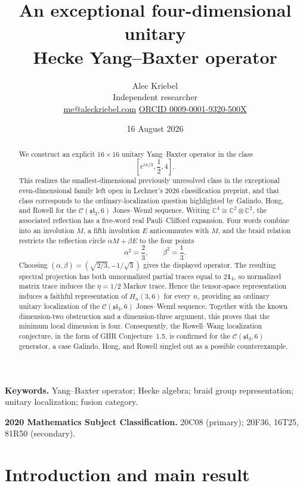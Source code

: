 \documentclass[11pt]{article}
\title{\vspace{-1.4cm}\textbf{An exceptional four-dimensional unitary}\\[0.2em]
\textbf{Hecke Yang--Baxter operator}}
\author{Alec Kriebel\\[-0.1em]
\small Independent researcher\\[-0.1em]
\small \href{mailto:me@aleckriebel.com}{me@aleckriebel.com}
\quad\textperiodcentered\quad
\href{https://orcid.org/0009-0001-9320-500X}{ORCID 0009-0001-9320-500X}}
\date{16 August 2026}
\theoremstyle{remark}
\newcommand{\Id}{\mathbf 1}
\newcommand{\bbC}{\mathbb C}
\newcommand{\cC}{\mathcal C}
\begin{document}
\maketitle

\begin{abstract}
We construct an explicit \(16\times16\) unitary Yang--Baxter operator in the
class
\[
  \left[e^{i\pi/3},\frac12,4\right].
\]
This realizes the smallest-dimensional previously unresolved class in the
exceptional even-dimensional family left open in Lechner's 2026 classification
preprint, and that class corresponds to the ordinary-localization question
highlighted by Galindo, Hong, and Rowell for the
\(\cC(\mathfrak{sl}_3,6)\) Jones--Wenzl sequence.  Writing
\(\bbC^4\cong\bbC^2\otimes\bbC^2\), the associated
reflection has a five-word real Pauli--Clifford expansion.  Four words combine
into an involution \(M\), a fifth involution \(E\) anticommutes with \(M\), and
the braid relation restricts the reflection circle \(\alpha M+\beta E\) to the
four points
\[
  \alpha^2=\frac23,\qquad \beta^2=\frac13.
\]
Choosing \((\alpha,\beta)=(\sqrt{2/3},-1/\sqrt3)\) gives the displayed
operator.
The resulting spectral projection has both unnormalized partial traces equal
to \(2\Id_4\), so normalized matrix trace induces the \(\eta=1/2\) Markov
trace.  Hence the tensor-space representation induces a faithful
representation of \(H_n(3,6)\) for every \(n\), providing an ordinary unitary
localization of the \(\cC(\mathfrak{sl}_3,6)\) Jones--Wenzl sequence.
Together with the known dimension-two obstruction and a dimension-three
argument, this proves that the minimum local dimension is four.
Consequently, the Rowell--Wang localization conjecture, in the form of GHR
Conjecture~1.5, is confirmed for the \(\cC(\mathfrak{sl}_3,6)\) generator, a
case Galindo, Hong, and Rowell singled out as a possible counterexample.
\end{abstract}

\medskip
\noindent\textbf{Keywords.}
Yang--Baxter operator; Hecke algebra; braid group representation; unitary
localization; fusion category.

\smallskip
\noindent\textbf{2020 Mathematics Subject Classification.}
20C08 (primary); 20F36, 16T25, 81R50 (secondary).

\section{Introduction and main result}
\end{document}
